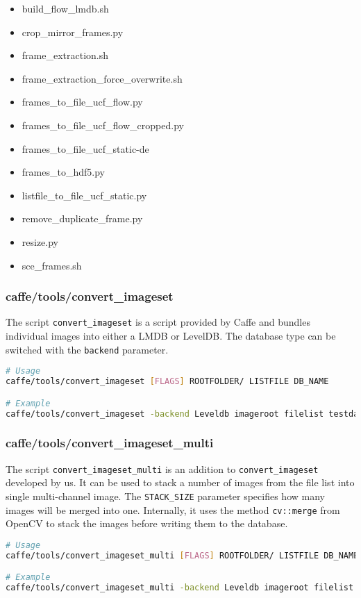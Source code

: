 \begin{itemize}
\item build\_flow\_lmdb.sh
\item crop\_mirror\_frames.py
\item frame\_extraction.sh
\item frame\_extraction\_force\_overwrite.sh
\item frames\_to\_file\_ucf\_flow.py
\item frames\_to\_file\_ucf\_flow\_cropped.py
\item frames\_to\_file\_ucf\_static-de
\item frames\_to\_hdf5.py
\item listfile\_to\_file\_ucf\_static.py
\item remove\_duplicate\_frame.py
\item resize.py
\item sce\_frames.sh
\end{itemize}

\subsubsection{caffe/tools/convert\_imageset}
The script \texttt{convert\_imageset} is a script provided by Caffe and bundles individual images into either a LMDB or LevelDB.
The database type can be switched with the \texttt{backend} parameter.

\begin{lstlisting}[language=sh, caption=convert\_image.sh, label=lst:convert_imageset]
# Usage
caffe/tools/convert_imageset [FLAGS] ROOTFOLDER/ LISTFILE DB_NAME

# Example
caffe/tools/convert_imageset -backend Leveldb imageroot filelist testdatabase.leveldb
\end{lstlisting}

\subsubsection{caffe/tools/convert\_imageset\_multi}
\label{subsec:convert_imageset_multi}
The script \texttt{convert\_imageset\_multi} is an addition to  \texttt{convert\_imageset} developed by us. It can be used to stack a number of images from the file list into single multi-channel image.
The \texttt{STACK\_SIZE} parameter specifies how many images will be merged into one.
Internally, it uses the method \texttt{cv::merge} from OpenCV to stack the images before writing them to the database.
\begin{lstlisting}[language=sh, caption=convert\_image\_multi.sh, label=lst:convert_imageset]
# Usage
caffe/tools/convert_imageset_multi [FLAGS] ROOTFOLDER/ LISTFILE DB_NAME STACK_SIZE

# Example
caffe/tools/convert_imageset_multi -backend Leveldb imageroot filelist testdatabase.leveldb 16 
\end{lstlisting}

